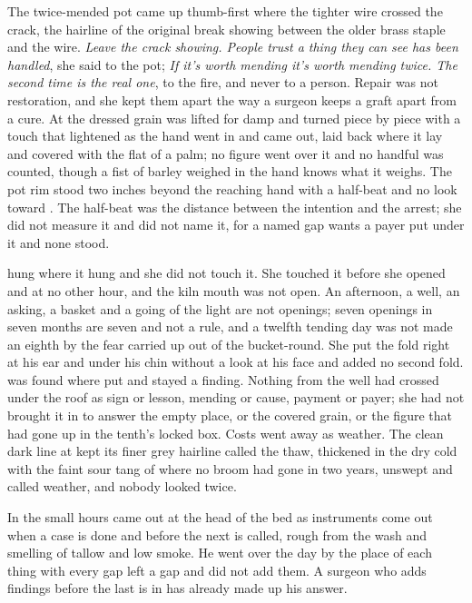 The twice-mended pot came up thumb-first where the tighter wire crossed the crack, the hairline of the original break showing between the older brass staple and the wire. \emph{Leave the crack showing. People trust a thing they can see has been handled}, she said to the pot; \emph{If it's worth mending it's worth mending twice. The second time is the real one}, to the fire, and never to a person. Repair was not restoration, and she kept them apart the way a surgeon keeps a graft apart from a cure. At  the dressed grain was lifted for damp and turned piece by piece with a touch that lightened as the hand went in and came out, laid back where it lay and covered with the flat of a palm; no figure went over it and no handful was counted, though a fist of barley weighed in the hand knows what it weighs. The pot rim stood two inches beyond the reaching hand with a half-beat and no look toward . The half-beat was the distance between the intention and the arrest; she did not measure it and did not name it, for a named gap wants a payer put under it and none stood.

 hung where it hung and she did not touch it. She touched it before she opened  and at no other hour, and the kiln mouth was not open. An afternoon, a well, an asking, a basket and a going of the light are not openings; seven openings in seven months are seven and not a rule, and a twelfth tending day was not made an eighth by the fear carried up out of the bucket-round. She put the fold right at his ear and under his chin without a look at his face and added no second fold.  was found where put and stayed a finding. Nothing from the well had crossed under the roof as sign or lesson, mending or cause, payment or payer; she had not brought it in to answer the empty place, or the covered grain, or the figure that had gone up  in the tenth's locked box. Costs went away as weather. The clean dark line at  kept its finer grey hairline called the thaw, thickened in the dry cold with the faint sour tang of  where no broom had gone in two years, unswept and called weather, and nobody looked twice.

\scenebreak

In the small hours  came out at the head of the bed as instruments come out when a case is done and before the next is called, rough from the wash and smelling of tallow and low smoke. He went over the day by the place of each thing with every gap left a gap and did not add them. A surgeon who adds findings before the last is in has already made up his answer.

